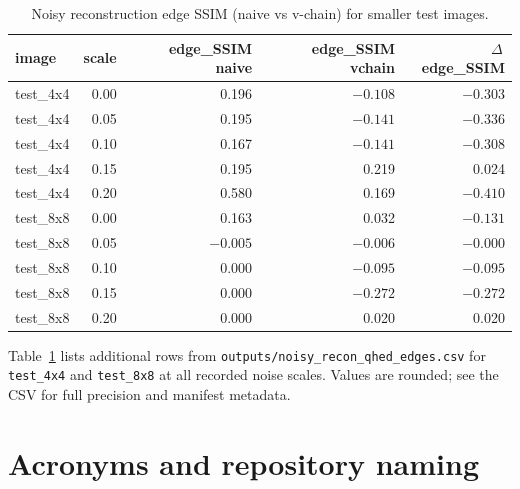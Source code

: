 \begin{table}[htbp]
\centering
\footnotesize
\caption{Noisy reconstruction edge SSIM (naive vs v-chain) for smaller test images.}
\label{tab:noisy-long}
\begin{tabular}{p{2.0cm}rrrr}
\toprule
image & scale & edge\_SSIM naive & edge\_SSIM vchain & $\Delta$\,edge\_SSIM \\
\midrule
test\_4x4 & 0.00 & 0.196 & $-0.108$ & $-0.303$ \\
test\_4x4 & 0.05 & 0.195 & $-0.141$ & $-0.336$ \\
test\_4x4 & 0.10 & 0.167 & $-0.141$ & $-0.308$ \\
test\_4x4 & 0.15 & 0.195 & 0.219 & 0.024 \\
test\_4x4 & 0.20 & 0.580 & 0.169 & $-0.410$ \\
test\_8x8 & 0.00 & 0.163 & 0.032 & $-0.131$ \\
test\_8x8 & 0.05 & $-0.005$ & $-0.006$ & $-0.000$ \\
test\_8x8 & 0.10 & $0.000$ & $-0.095$ & $-0.095$ \\
test\_8x8 & 0.15 & $0.000$ & $-0.272$ & $-0.272$ \\
test\_8x8 & 0.20 & $0.000$ & 0.020 & 0.020 \\
\bottomrule
\end{tabular}
\end{table}

Table~\ref{tab:noisy-long} lists additional rows from \texttt{outputs/noisy\_recon\_qhed\_edges.csv} for \texttt{test\_4x4} and \texttt{test\_8x8} at all recorded noise scales. Values are rounded; see the CSV for full precision and manifest metadata.

\chapter{Acronyms and repository naming}

